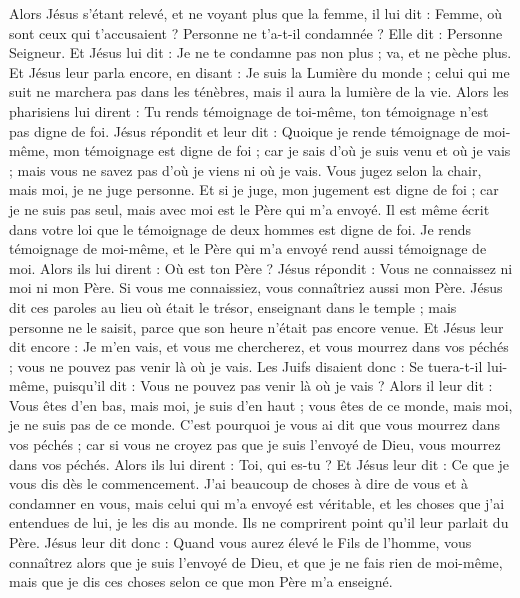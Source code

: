 \begin{multicols}{2}
Alors Jésus s'étant relevé, et ne voyant plus que la femme, il lui dit : Femme, où sont ceux qui t'accusaient ? Personne ne t'a-t-il condamnée ?
Elle dit : Personne Seigneur. Et Jésus lui dit : Je ne te condamne pas non plus ; va, et ne pèche plus.
Et Jésus leur parla encore, en disant : Je suis la Lumière du monde ; celui qui me suit ne marchera pas dans les ténèbres, mais il aura la lumière de la vie.
Alors les pharisiens lui dirent : Tu rends témoignage de toi-même, ton témoignage n'est pas digne de foi.
Jésus répondit et leur dit : Quoique je rende témoignage de moi-même, mon témoignage est digne de foi ; car je sais d'où je suis venu et où je vais ; mais vous ne savez pas d'où je viens ni où je vais.
Vous jugez selon la chair, mais moi, je ne juge personne.
Et si je juge, mon jugement est digne de foi ; car je ne suis pas seul, mais avec moi est le Père qui m'a envoyé.
Il est même écrit dans votre loi que le témoignage de deux hommes est digne de foi.
Je rends témoignage de moi-même, et le Père qui m'a envoyé rend aussi témoignage de moi.
Alors ils lui dirent : Où est ton Père ? Jésus répondit : Vous ne connaissez ni moi ni mon Père. Si vous me connaissiez, vous connaîtriez aussi mon Père.
Jésus dit ces paroles au lieu où était le trésor, enseignant dans le temple ; mais personne ne le saisit, parce que son heure n'était pas encore venue.
Et Jésus leur dit encore : Je m'en vais, et vous me chercherez, et vous mourrez dans vos péchés ; vous ne pouvez pas venir là où je vais.
Les Juifs disaient donc : Se tuera-t-il lui-même, puisqu'il dit : Vous ne pouvez pas venir là où je vais ?
Alors il leur dit : Vous êtes d'en bas, mais moi, je suis d'en haut ; vous êtes de ce monde, mais moi, je ne suis pas de ce monde.
C'est pourquoi je vous ai dit que vous mourrez dans vos péchés ; car si vous ne croyez pas que je suis l'envoyé de Dieu, vous mourrez dans vos péchés.
Alors ils lui dirent : Toi, qui es-tu ? Et Jésus leur dit : Ce que je vous dis dès le commencement.
J'ai beaucoup de choses à dire de vous et à condamner en vous, mais celui qui m'a envoyé est véritable, et les choses que j'ai entendues de lui, je les dis au monde.
Ils ne comprirent point qu'il leur parlait du Père.
Jésus leur dit donc : Quand vous aurez élevé le Fils de l'homme, vous connaîtrez alors que je suis l'envoyé de Dieu, et que je ne fais rien de moi-même, mais que je dis ces choses selon ce que mon Père m'a enseigné.

\end{multicols}
